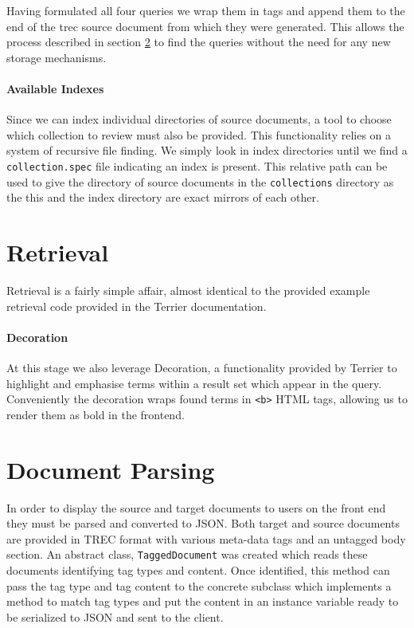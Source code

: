 \documentclass{l4proj}
\newcommand{\code}[1]{\texttt{#1}}
\begin{document}
Having formulated all four queries we wrap them in tags and append them to the end of the trec source document from which they were generated. This allows the process described in section \ref{docparse} to find the queries without the need for any new storage mechanisms.

\paragraph{Available Indexes}
Since we can index individual directories of source documents, a tool to choose which collection to review must also be provided. This functionality relies on a system of recursive file finding. We simply look in index directories until we find a \code{collection.spec} file indicating an index is present. This relative path can be used to give the directory of source documents in the \code{collections} directory as the this and the index directory are exact mirrors of each other.

\section{Retrieval}
Retrieval is a fairly simple affair, almost identical to the provided example retrieval code provided in the Terrier documentation.
\paragraph{Decoration}
At this stage we also leverage Decoration, a functionality provided by Terrier to highlight and emphasise terms within a result set which appear in the query. Conveniently the decoration wraps found terms in \code{<b>} HTML tags, allowing us to render them as bold in the frontend.

\section{Document Parsing} \label{docparse}
In order to display the source and target documents to users on the front end they must be parsed and converted to JSON.
Both target and source documents are provided in TREC format with various meta-data tags and an untagged body section.
An abstract class, \code{TaggedDocument} was created which reads these documents identifying tag types and content. Once identified, this method can pass the tag type and tag content to the concrete subclass which implements a method to match tag types and put the content in an instance variable ready to be serialized to JSON and sent to the client.
\end{document}
